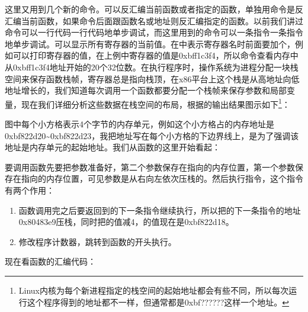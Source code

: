 这里又用到几个新的命令。可以反汇编当前函数或者指定的函数，单独用命令是反汇编当前函数，如果命令后面跟函数名或地址则反汇编指定的函数。以前我们讲过命令可以一行代码一行代码地单步调试，而这里用到的命令可以一条指令一条指令地单步调试。可以显示所有寄存器的当前值。在中表示寄存器名时前面要加个\BookCode{\$}，例如可以打印寄存器的值，在上例中寄存器的值是0xbff1c3f4，所以命令查看内存中从0xbff1c3f4地址开始的20个32位数。在执行程序时，操作系统为进程分配一块栈空间来保存函数栈帧，寄存器总是指向栈顶，在x86平台上这个栈是从高地址向低地址增长的，我们知道每次调用一个函数都要分配一个栈帧来保存参数和局部变量，现在我们详细分析这些数据在栈空间的布局，根据的输出结果图示如下\footnote[29]{Linux内核为每个新进程指定的栈空间的起始地址都会有些不同，所以每次运行这个程序得到的地址都不一样，但通常都是0xbf??????这样一个地址。}：




图中每个小方格表示4个字节的内存单元，例如这个小方格占的内存地址是0xbf822d20\textasciitilde{}\BookSplit{}0xbf822d23，我把地址写在每个小方格的下边界线上，是为了强调该地址是内存单元的起始地址。我们从函数的这里开始看起：




要调用函数先要把参数准备好，第二个参数保存在指向的内存位置，第一个参数保存在指向的内存位置，可见参数是从右向左依次压栈的。然后执行指令，这个指令有两个作用：


\begin{enumerate}

\item {}函数调用完之后要返回到的下一条指令继续执行，所以把的下一条指令的地址0x80483e9压栈，同时把的值减4，的值现在是0xbf822d18。

\item 修改程序计数器，跳转到函数的开头执行。
\end{enumerate}


现在看函数的汇编代码：


